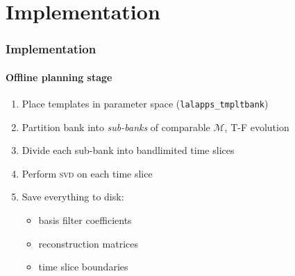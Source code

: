 \documentclass{beamer}
\begin{document}
\section{Implementation}

\begin{frame}
	\frametitle{Implementation}
	\framesubtitle{Offline planning stage}
	\begin{enumerate}
		\item Place templates in parameter space (\texttt{lalapps\_tmpltbank})
		\item Partition bank into \emph{sub-banks} of comparable $\mathcal{M}$, T-F evolution
		\item Divide each sub-bank into bandlimited time slices
		\item Perform \textsc{svd} on each time slice
		\item Save everything to disk:
			\begin{itemize}
				\item basis filter coefficients
				\item reconstruction matrices
				\item time slice boundaries
			\end{itemize}
	\end{enumerate}
	\begin{flushright}
	\end{flushright}
\end{frame}
\end{document}
